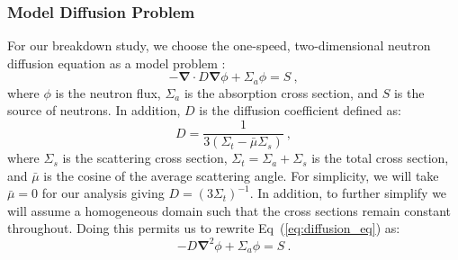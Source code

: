 \subsubsection{Model Diffusion Problem}
\label{subsec:model_problem}
For our breakdown study, we choose the one-speed, two-dimensional
neutron diffusion equation as a model problem
\citep{duderstadt_nuclear_1976}:
\begin{equation}
  -\boldsymbol{\nabla} \cdot D \boldsymbol{\nabla} \phi + \Sigma_a
  \phi = S\:,
  \label{eq:diffusion_eq}
\end{equation}
where $\phi$ is the neutron flux, $\Sigma_a$ is the absorption cross
section, and $S$ is the source of neutrons. In addition, $D$ is the
diffusion coefficient defined as:
\begin{equation}
  D = \frac{1}{3 ( \Sigma_t - \bar{\mu}\Sigma_s )}\:,
  \label{eq:diffusion_coeff}
\end{equation}
where $\Sigma_s$ is the scattering cross section, $\Sigma_t = \Sigma_a
+ \Sigma_s$ is the total cross section, and $\bar{\mu}$ is the cosine
of the average scattering angle. For simplicity, we will take
$\bar{\mu} = 0$ for our analysis giving $D=(3 \Sigma_t)^{-1}$. In
addition, to further simplify we will assume a homogeneous domain such
that the cross sections remain constant throughout. Doing this permits
us to rewrite Eq~(\ref{eq:diffusion_eq}) as:
\begin{equation}
  -D \boldsymbol{\nabla}^2 \phi + \Sigma_a \phi = S\:.
  \label{eq:diffusion_eq_simple}
\end{equation}

